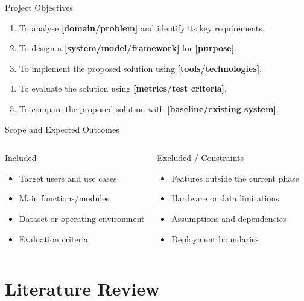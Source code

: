 \documentclass[aspectratio=169,11pt]{beamer}
\begin{document}
\begin{frame}{Project Objectives}
  \begin{enumerate}
    \item To analyse \textbf{[domain/problem]} and identify its key requirements.
    \item To design a \textbf{[system/model/framework]} for \textbf{[purpose]}.
    \item To implement the proposed solution using \textbf{[tools/technologies]}.
    \item To evaluate the solution using \textbf{[metrics/test criteria]}.
    \item To compare the proposed solution with \textbf{[baseline/existing system]}.
  \end{enumerate}
\end{frame}

\begin{frame}{Scope and Expected Outcomes}
  \begin{columns}[T,onlytextwidth]
      \begin{block}{Included}
        \begin{itemize}
          \item Target users and use cases
          \item Main functions/modules
          \item Dataset or operating environment
          \item Evaluation criteria
        \end{itemize}
      \end{block}
      \begin{block}{Excluded / Constraints}
        \begin{itemize}
          \item Features outside the current phase
          \item Hardware or data limitations
          \item Assumptions and dependencies
          \item Deployment boundaries
        \end{itemize}
      \end{block}
  \end{columns}
\end{frame}

\section{Literature Review}
\end{document}

